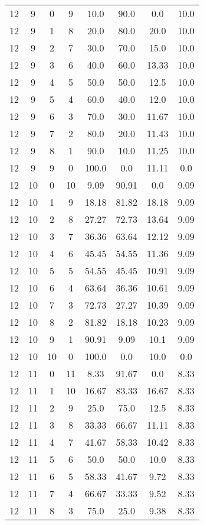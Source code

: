 \documentclass[9pt]{article}
\begin{document}
\begin{table}[h]
\begin{threeparttable}
\begin{tabular}{cccccccc}
12 & 9 & 0 & 9 & 10.0 & 90.0 & 0.0 & 10.0 \\
12 & 9 & 1 & 8 & 20.0 & 80.0 & 20.0 & 10.0 \\
12 & 9 & 2 & 7 & 30.0 & 70.0 & 15.0 & 10.0 \\
12 & 9 & 3 & 6 & 40.0 & 60.0 & 13.33 & 10.0 \\
12 & 9 & 4 & 5 & 50.0 & 50.0 & 12.5 & 10.0 \\
12 & 9 & 5 & 4 & 60.0 & 40.0 & 12.0 & 10.0 \\
12 & 9 & 6 & 3 & 70.0 & 30.0 & 11.67 & 10.0 \\
12 & 9 & 7 & 2 & 80.0 & 20.0 & 11.43 & 10.0 \\
12 & 9 & 8 & 1 & 90.0 & 10.0 & 11.25 & 10.0 \\
12 & 9 & 9 & 0 & 100.0 & 0.0 & 11.11 & 0.0 \\
12 & 10 & 0 & 10 & 9.09 & 90.91 & 0.0 & 9.09 \\
12 & 10 & 1 & 9 & 18.18 & 81.82 & 18.18 & 9.09 \\
12 & 10 & 2 & 8 & 27.27 & 72.73 & 13.64 & 9.09 \\
12 & 10 & 3 & 7 & 36.36 & 63.64 & 12.12 & 9.09 \\
12 & 10 & 4 & 6 & 45.45 & 54.55 & 11.36 & 9.09 \\
12 & 10 & 5 & 5 & 54.55 & 45.45 & 10.91 & 9.09 \\
12 & 10 & 6 & 4 & 63.64 & 36.36 & 10.61 & 9.09 \\
12 & 10 & 7 & 3 & 72.73 & 27.27 & 10.39 & 9.09 \\
12 & 10 & 8 & 2 & 81.82 & 18.18 & 10.23 & 9.09 \\
12 & 10 & 9 & 1 & 90.91 & 9.09 & 10.1 & 9.09 \\
12 & 10 & 10 & 0 & 100.0 & 0.0 & 10.0 & 0.0 \\
12 & 11 & 0 & 11 & 8.33 & 91.67 & 0.0 & 8.33 \\
12 & 11 & 1 & 10 & 16.67 & 83.33 & 16.67 & 8.33 \\
12 & 11 & 2 & 9 & 25.0 & 75.0 & 12.5 & 8.33 \\
12 & 11 & 3 & 8 & 33.33 & 66.67 & 11.11 & 8.33 \\
12 & 11 & 4 & 7 & 41.67 & 58.33 & 10.42 & 8.33 \\
12 & 11 & 5 & 6 & 50.0 & 50.0 & 10.0 & 8.33 \\
12 & 11 & 6 & 5 & 58.33 & 41.67 & 9.72 & 8.33 \\
12 & 11 & 7 & 4 & 66.67 & 33.33 & 9.52 & 8.33 \\
12 & 11 & 8 & 3 & 75.0 & 25.0 & 9.38 & 8.33 \\

\end{tabular}
\end{threeparttable}
\end{table}
\end{document}
